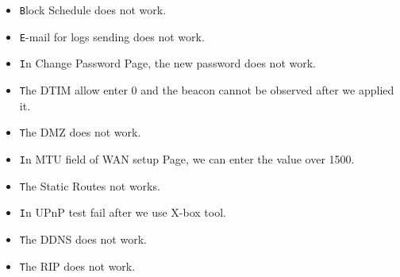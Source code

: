 \documentclass[12pt]{report}
\begin{document}
\begin{itemize}
\begin{enumerate}
\begin{itemize}
  \item \texttt Block Schedule does not work.
  \item \texttt E-mail for logs sending does not work.
  \item \texttt In Change Password Page, the new password does not work.
  \item \texttt The DTIM allow enter 0 and the beacon cannot be observed after we applied it.
  \item \texttt The DMZ does not work.
  \item \texttt In MTU field of WAN setup Page, we can enter the value over 1500.
  \item \texttt The Static Routes not works.
  \item \texttt In UPnP test fail after we use X-box tool.
  \item \texttt The DDNS does not work.
  \item \texttt The RIP does not work.
  \end{itemize}
\end{enumerate}
\end{itemize}
\end{document}
